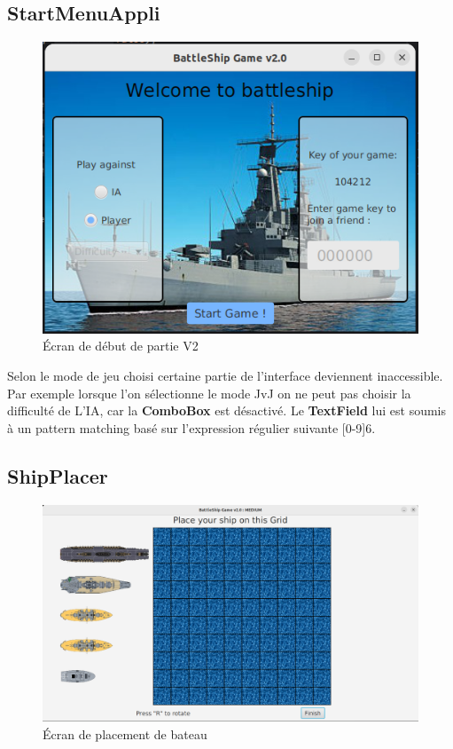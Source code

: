 \documentclass[12pt]{article}
\begin{document}
\subsection{StartMenuAppli}
\begin{figure}[H]
      \centering
      \includegraphics[width=0.60\linewidth]{images/image BN V2/startMenu.png}
      \caption{Écran de début de partie V2}
\end{figure}

Selon le mode de jeu choisi certaine partie de l'interface deviennent
inaccessible. Par exemple lorsque l'on sélectionne le mode JvJ on ne peut pas
choisir la difficulté de L'IA, car la \textbf{ComboBox} est désactivé. Le
\textbf{TextField} lui est soumis à un pattern matching basé sur l'expression
régulier suivante [0-9]{6}.

\bigskip

\subsection{ShipPlacer}
\begin{figure}[H]
      \centering
      \includegraphics[width=\textwidth]{images/image BN V2/ShipPlacer.png}
      \caption{Écran de placement de bateau}
\end{figure}
\end{document}
